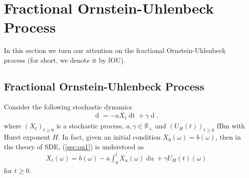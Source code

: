 \documentclass[a4paper, twoside, 11pt]{article}
\theoremstyle{definition}
\newtheorem{definition}{\scshape Definition}[section]
\newtheorem{theorem}[definition]{\scshape Theorem}
\begin{document}



\newpage
\section{Fractional Ornstein-Uhlenbeck Process}
\setcounter{equation}{0}
In this section we turn our attention on the fractional Ornstein-Uhlenbeck process (for short, we denote it by fOU). 
\subsection{Fractional Ornstein-Uhlenbeck Process}
Consider the following stochastic dynamics
\begin{eqnarray}
 \mathop{dX_t} = -aX_t\mathop{dt} + \gamma \mathop{dU_H(t)},
 \label{sec:ou1}
\end{eqnarray}
where $(X_t)_{t\ge 0}$ is a stochastic process, $a, \gamma\in\mathbb{R}_{+}$ and $(U_H(t))_{t\ge 0} $ fBm with Hurst exponent $H$. In fact, given an initial condition $X_0(\omega)=b(\omega)$, then in the theory of SDE, (\ref{sec:ou1}) is understood as
\begin{eqnarray}
  X_t(\omega) = b(\omega) - a\int_0^t X_u(\omega) \mathop{du} + \gamma U_H(t)(\omega)
  \label{sec:oup}
\end{eqnarray}
for $t \ge 0$.
\end{document}

